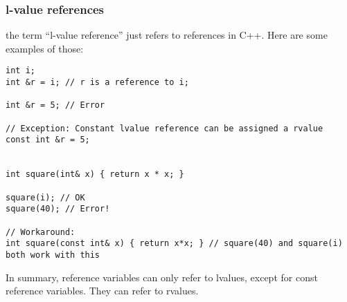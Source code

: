 \documentclass{report}
\begin{document}
\subsubsection*{l-value references}
the term ``l-value reference'' just refers to references in C++. Here are some examples of those:
\begin{verbatim}
int i;
int &r = i; // r is a reference to i;

int &r = 5; // Error

// Exception: Constant lvalue reference can be assigned a rvalue
const int &r = 5;


int square(int& x) { return x * x; }

square(i); // OK
square(40); // Error!

// Workaround:
int square(const int& x) { return x*x; } // square(40) and square(i) both work with this

\end{verbatim}
In summary, reference variables can only refer to lvalues, except for const reference variables. They can refer to rvalues.
\end{document}

